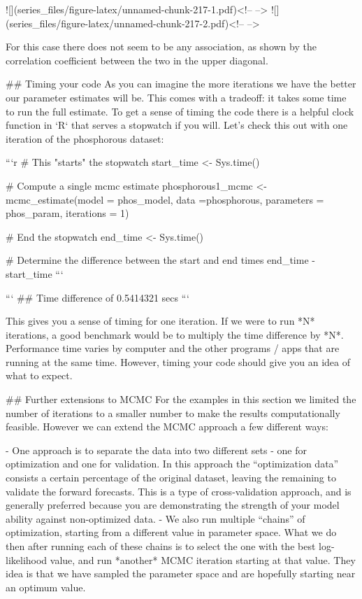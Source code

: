 \documentclass[
]{book}
\theoremstyle{definition}
\theoremstyle{definition}
\theoremstyle{definition}
\theoremstyle{remark}
\begin{document}
![](series_files/figure-latex/unnamed-chunk-217-1.pdf)<!-- --> ![](series_files/figure-latex/unnamed-chunk-217-2.pdf)<!-- --> 

For this case there does not seem to be any association, as shown by the correlation coefficient between the two in the upper diagonal.



## Timing your code
As you can imagine the more iterations we have the better our parameter estimates will be.  This comes with a tradeoff: it takes some time to run the full estimate.  To get a sense of timing the code there is a helpful clock function in `R` that serves a stopwatch if you will.  Let's check this out with one iteration of the phosphorous dataset:


```r
# This "starts" the stopwatch
start_time <- Sys.time()

# Compute a single mcmc estimate
phosphorous1_mcmc <- mcmc_estimate(model = phos_model,
                                   data =phosphorous,
                                   parameters = phos_param,
                                   iterations = 1)

# End the stopwatch
end_time <- Sys.time()

# Determine the difference between the start and end times
end_time - start_time
```

```
## Time difference of 0.5414321 secs
```

This gives you a sense of timing for one iteration.  If we were to run *N* iterations, a good benchmark would be to multiply the time difference by *N*.  Performance time varies by computer and the other programs / apps that are running at the same time.  However, timing your code should give you an idea of what to expect.


## Further extensions to MCMC
For the examples in this section we limited the number of iterations to a smaller number to make the results computationally feasible.  However we can extend the MCMC approach a few different ways:

- One approach is to separate the data into two different sets - one for optimization and one for validation. In this approach the ``optimization data'' consists a certain percentage of the original dataset, leaving the remaining to validate the forward forecasts.  This is a type of cross-validation approach, and is generally preferred because you are demonstrating the strength of your model ability against non-optimized data.
- We also run multiple ``chains'' of optimization, starting from a different value in parameter space.  What we do then after running each of these chains is to select the one with the best log-likelihood value, and run *another* MCMC iteration starting at that value.  They idea is that we have sampled the parameter space and are hopefully starting near an optimum value.
\end{document}
